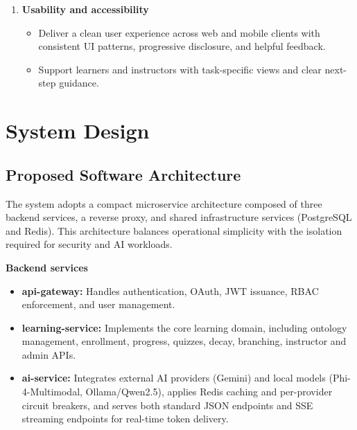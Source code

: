 \begin{enumerate}
        \begin{itemize}
            \item Provide health checks and graceful failure paths; apply circuit breakers for AI services to prevent cascading failures.
            \item Maintain continuity in the learning flow even when AI providers are unavailable by using Redis-cached responses or automatically failing over to the next-tier provider in the three-tier chain (Phi-4 $\to$ Ollama $\to$ Gemini).
        \end{itemize}
    \item \textbf{Usability and accessibility}
        \begin{itemize}
            \item Deliver a clean user experience across web and mobile clients with consistent UI patterns, progressive disclosure, and helpful feedback.
            \item Support learners and instructors with task-specific views and clear next-step guidance.
        \end{itemize}
\end{enumerate}

\section{System Design}

\subsection{Proposed Software Architecture}

The system adopts a compact microservice architecture composed of three backend services, a reverse proxy, and shared infrastructure services (PostgreSQL and Redis). This architecture balances operational simplicity with the isolation required for security and AI workloads.

\textbf{Backend services}

\begin{itemize}
    \item \textbf{api-gateway:} Handles authentication, OAuth, JWT issuance, RBAC enforcement, and user management.
    \item \textbf{learning-service:} Implements the core learning domain, including ontology management, enrollment, progress, quizzes, decay, branching, instructor and admin APIs.
    \item \textbf{ai-service:} Integrates external AI providers (Gemini) and local models (Phi-4-Multimodal, Ollama/Qwen2.5), applies Redis caching and per-provider circuit breakers, and serves both standard JSON endpoints and SSE streaming endpoints for real-time token delivery.
\end{itemize}

